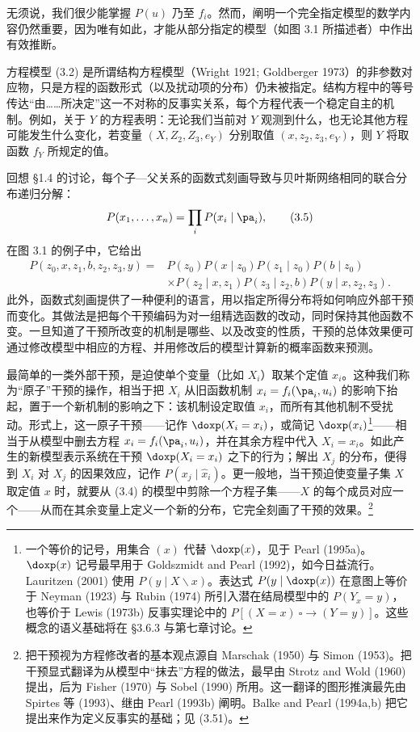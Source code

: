 无须说，我们很少能掌握 $P(u)$ 乃至 $f_i$。然而，阐明一个完全指定模型的数学内容仍然重要，因为唯有如此，才能从部分指定的模型（如图 3.1 所描述者）中作出有效推断。

方程模型 \textup{(3.2)} 是所谓结构方程模型（Wright 1921; Goldberger 1973）的非参数对应物，只是方程的函数形式（以及扰动项的分布）仍未被指定。结构方程中的等号传达“由……所决定”这一不对称的反事实关系，每个方程代表一个稳定自主的机制。例如，关于 $Y$ 的方程表明：无论我们当前对 $Y$ 观测到什么，也无论其他方程可能发生什么变化，若变量 $(X,Z_2,Z_3,e_Y)$ 分别取值 $(x,z_2,z_3,e_Y)$，则 $Y$ 将取函数 $f_Y$ 所规定的值。

回想 \S 1.4 的讨论，每个子—父关系的函数式刻画导致与贝叶斯网络相同的联合分布递归分解：
\begin{equation}
P(x_1,\dots,x_n) = \prod_i P(x_i\mid\pa_i), \tag{3.5}
\end{equation}
在图 3.1 的例子中，它给出
\begin{equation}
\begin{aligned}
P(z_0,x,z_1,b,z_2,z_3,y) = {}& P(z_0)P(x\mid z_0)P(z_1\mid z_0)P(b\mid z_0)\\
& \times P(z_2\mid x,z_1)P(z_3\mid z_2,b)P(y\mid x,z_2,z_3).
\end{aligned} \tag{3.6}
\end{equation}
此外，函数式刻画提供了一种便利的语言，用以指定所得分布将如何响应外部干预而变化。其做法是把每个干预编码为对一组精选函数的改动，同时保持其他函数不变。一旦知道了干预所改变的机制是哪些、以及改变的性质，干预的总体效果便可通过修改模型中相应的方程、并用修改后的模型计算新的概率函数来预测。

最简单的一类外部干预，是迫使单个变量（比如 $X_i$）取某个定值 $x_i$。这种我们称为“原子”干预的操作，相当于把 $X_i$ 从旧函数机制 $x_i=f_i(\pa_i,u_i)$ 的影响下抬起，置于一个新机制的影响之下：该机制设定取值 $x_i$，而所有其他机制不受扰动。形式上，这一原子干预——记作 $\doxp(X_i=x_i)$，或简记 $\doxp(x_i)$\footnote{一个等价的记号，用集合 $(x)$ 代替 $\doxp(x)$，见于 Pearl (1995a)。$\doxp(x)$ 记号最早用于 Goldszmidt and Pearl (1992)，如今日益流行。Lauritzen (2001) 使用 $P(y\mid X\backslash x)$。表达式 $P(y\mid\doxp(x))$ 在意图上等价于 Neyman (1923) 与 Rubin (1974) 所引入潜在结局模型中的 $P(Y_x=y)$，也等价于 Lewis (1973b) 反事实理论中的 $P[(X=x)\ \square\!\!\to (Y=y)]$。这些概念的语义基础将在 \S 3.6.3 与第七章讨论。}——相当于从模型中删去方程 $x_i=f_i(\pa_i,u_i)$，并在其余方程中代入 $X_i=x_i$。如此产生的新模型表示系统在干预 $\doxp(X_i=x_i)$ 之下的行为；解出 $X_j$ 的分布，便得到 $X_i$ 对 $X_j$ 的因果效应，记作 $P(x_j\mid\hat{x}_i)$。更一般地，当干预迫使变量子集 $X$ 取定值 $x$ 时，就要从 \textup{(3.4)} 的模型中剪除一个方程子集——$X$ 的每个成员对应一个——从而在其余变量上定义一个新的分布，它完全刻画了干预的效果。\footnote{把干预视为方程修改者的基本观点源自 Marschak (1950) 与 Simon (1953)。把干预显式翻译为从模型中“抹去”方程的做法，最早由 Strotz and Wold (1960) 提出，后为 Fisher (1970) 与 Sobel (1990) 所用。这一翻译的图形推演最先由 Spirtes 等 (1993)、继由 Pearl (1993b) 阐明。Balke and Pearl (1994a,b) 把它提出来作为定义反事实的基础；见 \textup{(3.51)}。}

